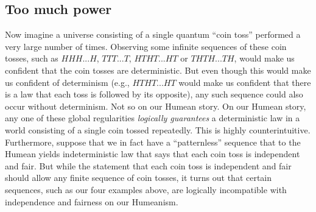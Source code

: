 \subsection{Too much power}
Now imagine a universe consisting of a single quantum ``coin toss'' performed a very large number of times. Observing some 
infinite sequences of these coin tosses, such as $HHH...H$, $TTT...T$, $HTHT...HT$ or $THTH...TH$, would make us confident 
that the coin tosses are deterministic. But even though this would make us confident of determinism (e.g., $HTHT...HT$
would make us confident that there is a law that each toss is followed by its opposite), any such sequence could also
occur without determinism. Not so on our Humean story. On our Humean story, any one of these global regularities \textit{logically 
guarantees} a deterministic law in a world consisting of a single coin tossed repeatedly. This is highly counterintuitive. 
Furthermore, suppose that we in fact have a ``patternless'' sequence that to the Humean yields indeterministic law that says 
that each coin toss is independent and fair. But while the statement that each coin toss is independent and fair should allow any 
finite sequence of coin tosses, it turns out that certain sequences, such as our four examples above, are logically incompatible with 
independence and fairness on our Humeanism.

